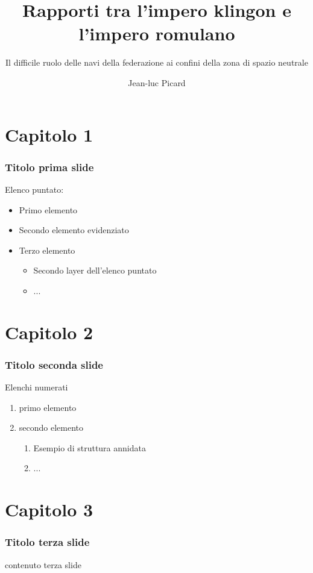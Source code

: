 \documentclass{beamer}
\title[Titolo breve]{Rapporti tra l'impero klingon e l'impero romulano}
\subtitle{Il difficile ruolo delle navi della federazione ai confini della zona di spazio neutrale}
\institute{Università degli studi di Trieste}
\author[Nome Cognome]{Jean-luc Picard}
\begin{document}
	
\begin{frame}
\setTitlestyleDissertation
\maketitle
\end{frame}


\section{Capitolo 1}
\begin{frame}
    \frametitle{Titolo prima slide}
    Elenco puntato: 
    \begin{itemize}
        \item Primo elemento
        \item<alert@1> Secondo elemento evidenziato 
        \item Terzo elemento
            \begin{itemize}
                \item Secondo layer dell'elenco puntato
                \item ... 
            \end{itemize}
    \end{itemize}
\end{frame}


\section{Capitolo 2}
\begin{frame}
    \frametitle{Titolo seconda slide}
    Elenchi numerati 
    \begin{enumerate}
        \item primo elemento 
        \item secondo elemento
            \begin{enumerate}
                \item Esempio di struttura annidata
                \item ...
            \end{enumerate}
    \end{enumerate}
\end{frame}




\section{Capitolo 3}
\begin{frame}
    \frametitle{Titolo terza slide}
    contenuto terza slide
\end{frame}
\end{document}
